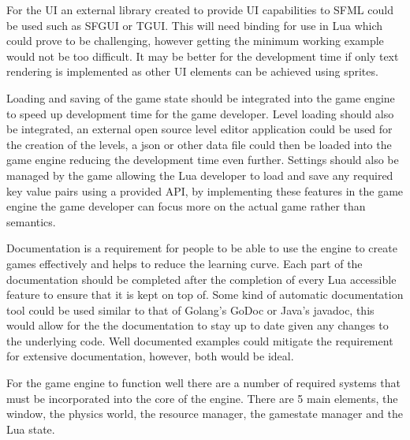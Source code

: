\documentclass[11pt,a4paper,titlepage]{article}
\begin{document}
	For the UI an external library created to provide UI capabilities to SFML could be used such as SFGUI or TGUI. This will need binding for use in Lua which could prove to be challenging, however getting the minimum working example would not be too difficult. It may be better for the development time if only text rendering is implemented as other UI elements can be achieved using sprites.

	Loading and saving of the game state should be integrated into the game engine to speed up development time for the game developer. Level loading should also be integrated, an external open source level editor application could be used for the creation of the levels, a json or other data file could then be loaded into the game engine reducing the development time even further. Settings should also be managed by the game allowing the Lua developer to load and save any required key value pairs using a provided API, by implementing these features in the game engine the game developer can focus more on the actual game rather than semantics.

	Documentation is a requirement for people to be able to use the engine to create games effectively and helps to reduce the learning curve. Each part of the documentation should be completed after the completion of every Lua accessible feature to ensure that it is kept on top of. Some kind of automatic documentation tool could be used similar to that of Golang's GoDoc or Java's javadoc, this would allow for the the documentation to stay up to date given any changes to the underlying code. Well documented examples could mitigate the requirement for extensive documentation, however, both would be ideal.

	
	For the game engine to function well there are a number of required systems that must be incorporated into the core of the engine. There are 5 main elements, the window, the physics world, the resource manager, the gamestate manager and the Lua state.
\end{document}
